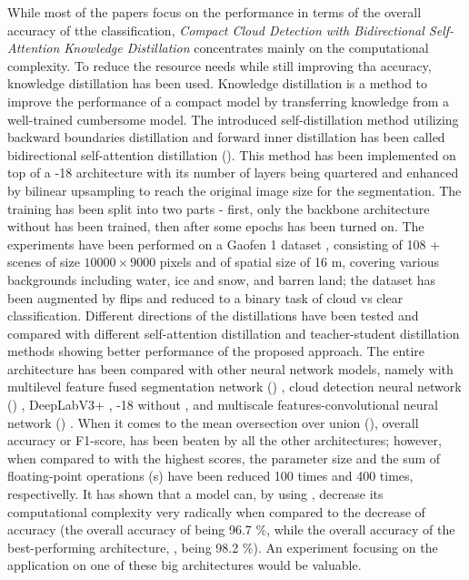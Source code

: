 While most of the papers focus on the performance in terms of the overall accuracy of tthe classification, \textit{Compact Cloud Detection with Bidirectional Self-Attention Knowledge Distillation} concentrates mainly on the computational complexity. To reduce the resource needs while still improving tha accuracy, knowledge distillation \cite{knowledge-distillation} has been used. Knowledge  distillation  is  a  method  to  improve  the  performance  of  a  compact  model  by transferring knowledge from a well-trained cumbersome model. The introduced self-distillation method \cite{sad} utilizing backward boundaries distillation and forward inner distillation has been called bidirectional self-attention distillation (). This method has been implemented on top of a -18 \cite{resnet} architecture with its number of layers being quartered and enhanced by bilinear upsampling to reach the original image size for the segmentation. The training has been split into two parts - first, only the backbone architecture without  has been trained, then after some epochs  has been turned on. The experiments have been performed on a Gaofen 1 dataset \cite{gf-1-cloud-dataset}, consisting of 108  +  scenes of size $10000 \times 9000$ pixels and of spatial size of 16 m, covering various backgrounds including water, ice and snow, and barren land; the dataset has been augmented by flips and reduced to a binary task of cloud vs clear classification. Different directions of the distillations have been tested and compared with different self-attention distillation and teacher-student distillation methods \cite{t-s-distillation} showing better performance of the proposed approach. The entire architecture has been compared with other neural network models, namely with multilevel feature fused segmentation network () \cite{mffsnet}, cloud detection neural network () \cite{cdnet}, DeepLabV3+ \cite{deeplab-3}, -18 without , and multiscale features-convolutional neural network () \cite{mf-cnn}. When it comes to the mean oversection over union (), overall accuracy or F1-score,  has been beaten by all the other architectures; however, when compared to  with the highest scores, the parameter size and the sum of floating-point operations (s) have been reduced 100 times and 400 times, respectivelly. It has shown that a model can, by using , decrease its computational complexity very radically when compared to the decrease of accuracy (the overall accuracy of  being 96.7 \%, while the overall accuracy of the best-performing architecture, , being 98.2 \%). An experiment focusing on the  application on one of these big architectures would be valuable.

